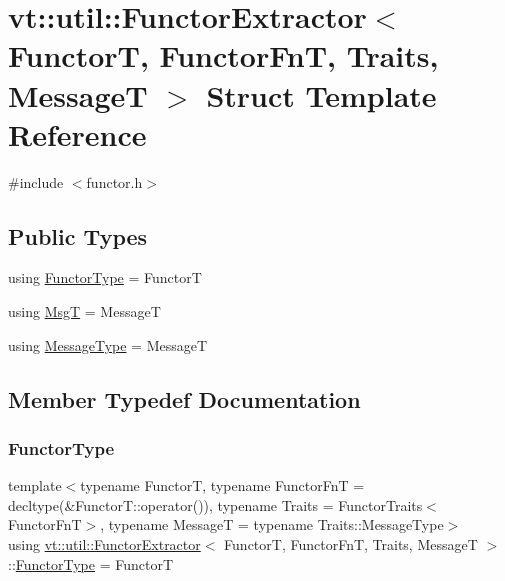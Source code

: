 \hypertarget{structvt_1_1util_1_1_functor_extractor}{}\section{vt\+:\+:util\+:\+:Functor\+Extractor$<$ FunctorT, Functor\+FnT, Traits, MessageT $>$ Struct Template Reference}
\label{structvt_1_1util_1_1_functor_extractor}


{\ttfamily \#include $<$functor.\+h$>$}

\subsection*{Public Types}
\begin{DoxyCompactItemize}
\item 
using \hyperlink{structvt_1_1util_1_1_functor_extractor_a9a48c3c982d2582c54a91584d3a02dda}{Functor\+Type} = FunctorT
\item 
using \hyperlink{structvt_1_1util_1_1_functor_extractor_a6806fe1c31dcbaaeb42221844a396caa}{MsgT} = MessageT
\item 
using \hyperlink{structvt_1_1util_1_1_functor_extractor_a6da3f67871dbf871f832dd5efad726d4}{Message\+Type} = MessageT
\end{DoxyCompactItemize}


\subsection{Member Typedef Documentation}
\mbox{\label{structvt_1_1util_1_1_functor_extractor_a9a48c3c982d2582c54a91584d3a02dda}} 
\subsubsection{\texorpdfstring{Functor\+Type}{FunctorType}}
{\footnotesize\ttfamily template$<$typename FunctorT, typename Functor\+FnT = decltype(\&\+Functor\+T\+::operator()), typename Traits = Functor\+Traits$<$\+Functor\+Fn\+T$>$, typename MessageT = typename Traits\+::\+Message\+Type$>$ \\
using \hyperlink{structvt_1_1util_1_1_functor_extractor}{vt\+::util\+::\+Functor\+Extractor}$<$ FunctorT, Functor\+FnT, Traits, MessageT $>$\+::\hyperlink{structvt_1_1util_1_1_functor_extractor_a9a48c3c982d2582c54a91584d3a02dda}{Functor\+Type} =  FunctorT}

